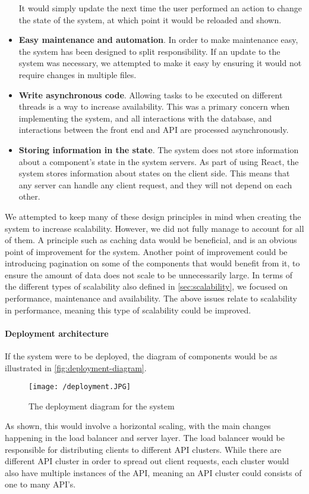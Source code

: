 \begin{itemize}
    It would simply update the next time the user performed an action to change the state of the system, at which point it would be reloaded and shown.
    \item \textbf{Easy maintenance and automation}. In order to make maintenance easy, the system has been designed to split responsibility.
    If an update to the system was necessary, we attempted to make it easy by ensuring it would not require changes in multiple files.
    \item \textbf{Write asynchronous code}. Allowing tasks to be executed on different threads is a way to increase availability. 
    This was a primary concern when implementing the system, and all interactions with the database, and interactions between the front end and API are processed asynchronously.
    \item \textbf{Storing information in the state}. The system does not store information about a component's state in the system servers.
    As part of using React, the system stores information about states on the client side.
    This means that any server can handle any client request, and they will not depend on each other.
\end{itemize}
We attempted to keep many of these design principles in mind when creating the system to increase scalability.
However, we did not fully manage to account for all of them.
A principle such as caching data would be beneficial, and is an obvious point of improvement for the system.
Another point of improvement could be introducing pagination on some of the components that would benefit from it, to ensure the amount of data does not scale to be unnecessarily large.
In terms of the different types of scalability also defined in \autoref{sec:scalability}, we focused on performance, maintenance and availability.
The above issues relate to scalability in performance, meaning this type of scalability could be improved.

\paragraph{Deployment architecture}
If the system were to be deployed, the diagram of components would be as illustrated in \autoref{fig:deployment-diagram}.
\begin{figure}[H]
    \texttt{[image: /deployment.JPG]}
     \caption{The deployment diagram for the system}
     \label{fig:deployment-diagram}
 \end{figure}
 \noindent
As shown, this would involve a horizontal scaling, with the main changes happening in the load balancer and server layer.
The load balancer would be responsible for distributing clients to different API clusters.
While there are different API cluster in order to spread out client requests, each cluster would also have multiple instances of the API, meaning an API cluster could consists of one to many API's.

